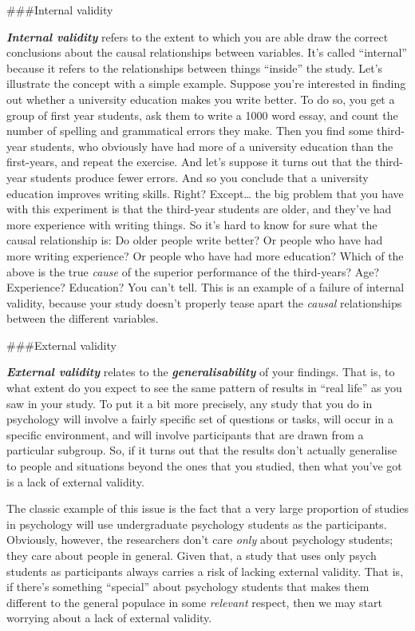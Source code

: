 \documentclass[]{book}
\begin{document}
\#\#\#Internal validity

\textbf{\emph{Internal validity}} refers to the extent to which you are able draw the correct conclusions about the causal relationships between variables. It's called ``internal'' because it refers to the relationships between things ``inside'' the study. Let's illustrate the concept with a simple example. Suppose you're interested in finding out whether a university education makes you write better. To do so, you get a group of first year students, ask them to write a 1000 word essay, and count the number of spelling and grammatical errors they make. Then you find some third-year students, who obviously have had more of a university education than the first-years, and repeat the exercise. And let's suppose it turns out that the third-year students produce fewer errors. And so you conclude that a university education improves writing skills. Right? Except\ldots{} the big problem that you have with this experiment is that the third-year students are older, and they've had more experience with writing things. So it's hard to know for sure what the causal relationship is: Do older people write better? Or people who have had more writing experience? Or people who have had more education? Which of the above is the true \emph{cause} of the superior performance of the third-years? Age? Experience? Education? You can't tell. This is an example of a failure of internal validity, because your study doesn't properly tease apart the \emph{causal} relationships between the different variables.

\#\#\#External validity

\textbf{\emph{External validity}} relates to the \textbf{\emph{generalisability}} of your findings. That is, to what extent do you expect to see the same pattern of results in ``real life'' as you saw in your study. To put it a bit more precisely, any study that you do in psychology will involve a fairly specific set of questions or tasks, will occur in a specific environment, and will involve participants that are drawn from a particular subgroup. So, if it turns out that the results don't actually generalise to people and situations beyond the ones that you studied, then what you've got is a lack of external validity.

The classic example of this issue is the fact that a very large proportion of studies in psychology will use undergraduate psychology students as the participants. Obviously, however, the researchers don't care \emph{only} about psychology students; they care about people in general. Given that, a study that uses only psych students as participants always carries a risk of lacking external validity. That is, if there's something ``special'' about psychology students that makes them different to the general populace in some \emph{relevant} respect, then we may start worrying about a lack of external validity.
\end{document}
